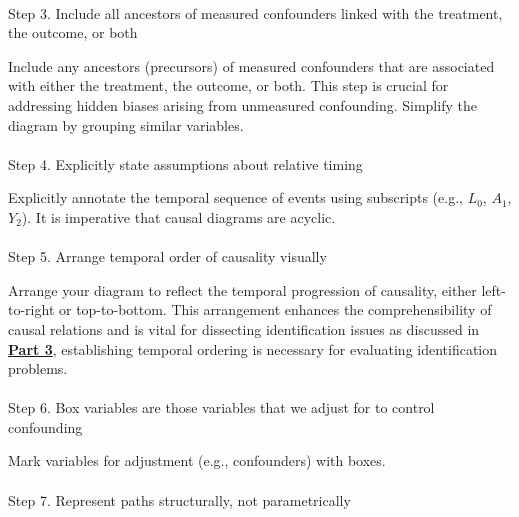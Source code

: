 \documentclass[
  single column]{article}
\makeatletter
\let\oldparagraph\paragraph
\renewcommand{\paragraph}{
    \@ifstar
      \xxxParagraphStar
      \xxxParagraphNoStar
  }
\newcommand{\xxxParagraphStar}[1]{\oldparagraph*{#1}\mbox{}}
\newcommand{\xxxParagraphNoStar}[1]{\oldparagraph{#1}\mbox{}}
\makeatother
\begin{document}
\paragraph{Step 3. Include all ancestors of measured confounders linked
with the treatment, the outcome, or
both}\label{step-3.-include-all-ancestors-of-measured-confounders-linked-with-the-treatment-the-outcome-or-both}

Include any ancestors (precursors) of measured confounders that are
associated with either the treatment, the outcome, or both. This step is
crucial for addressing hidden biases arising from unmeasured
confounding. Simplify the diagram by grouping similar variables.

\paragraph{Step 4. Explicitly state assumptions about relative
timing}\label{step-4.-explicitly-state-assumptions-about-relative-timing}

Explicitly annotate the temporal sequence of events using subscripts
(e.g., \(L_0\), \(A_1\), \(Y_2\)). It is imperative that causal diagrams
are acyclic.

\paragraph{Step 5. Arrange temporal order of causality
visually}\label{step-5.-arrange-temporal-order-of-causality-visually}

Arrange your diagram to reflect the temporal progression of causality,
either left-to-right or top-to-bottom. This arrangement enhances the
comprehensibility of causal relations and is vital for dissecting
identification issues as discussed in \hyperref[sec-part3]{\textbf{Part
3}}, establishing temporal ordering is necessary for evaluating
identification problems.

\paragraph{Step 6. Box variables are those variables that we adjust for
to control
confounding}\label{step-6.-box-variables-are-those-variables-that-we-adjust-for-to-control-confounding}

Mark variables for adjustment (e.g., confounders) with boxes.

\paragraph{Step 7. Represent paths structurally, not
parametrically}\label{step-7.-represent-paths-structurally-not-parametrically}
\end{document}
